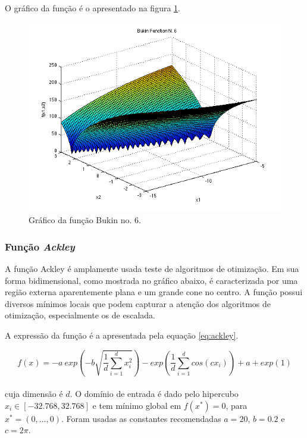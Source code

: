 \documentclass[a4paper,12pt]{article}
\begin{document}
O gráfico da função é o apresentado na figura \ref{fig:bukin6}.
\begin{figure}[htb]
\begin{center}
    \includegraphics[scale=0.5]{bukin6.png}
    \caption { Gráfico da função Bukin no. 6. }
	\label{fig:bukin6}
\end{center}
\end{figure}

\subsubsection{Função \textit{Ackley}}

A função Ackley é amplamente usada teste de algoritmos de otimização. Em sua forma bidimensional, como mostrada no gráfico abaixo, é caracterizada por uma região externa aparentemente plana e um grande cone no centro. A função possui diversos mínimos locais que podem capturar a atenção dos algoritmos de otimização, especialmente os de escalada.

A expressão da função é a apresentada pela equação \ref{eq:ackley}.

\begin{equation}
	f(x) = -a\ exp\left (-b \sqrt{\frac{1}{d}\sum_{i=1}^{d}x_i^2}\right ) - exp\left (\frac{1}{d}\sum_{i=1}^{d}cos(c x_i)\right ) + a + exp(1)
\label{eq:ackley}
\end{equation}
\\
cuja dimensão é $d$. O domínio de entrada é dado pelo hipercubo $x_i \in [-32.768, 32.768]$ e tem mínimo global em $f(x^*) = 0$, para $x^* = (0,\ldots,0)$. Foram usadas as constantes recomendadas $a = 20$, $b = 0.2$ e $c = 2\pi$.
\end{document}
